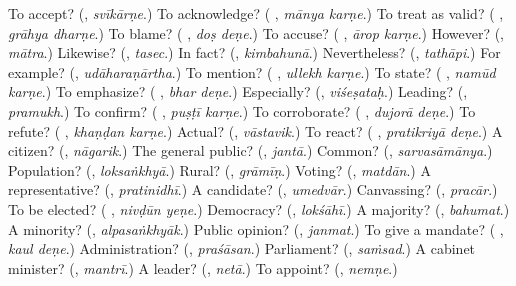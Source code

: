 \begin{tcolorbox}[breakable,colback=teal!4,colframe=teal!35!black,title={Before you move on}]
To accept? (\textbf{}, \emph{svīkārṇe}.) To acknowledge? (\textbf{ }, \emph{mānya karṇe}.) To treat as valid? (\textbf{ }, \emph{grāhya dharṇe}.) To blame? (\textbf{ }, \emph{doṣ deṇe}.) To accuse? (\textbf{ }, \emph{ārop karṇe}.) However? (\textbf{}, \emph{mātra}.) Likewise? (\textbf{}, \emph{tasec}.) In fact? (\textbf{}, \emph{kimbahunā}.) Nevertheless? (\textbf{}, \emph{tathāpi}.) For example? (\textbf{}, \emph{udāharaṇārtha}.) To mention? (\textbf{ }, \emph{ullekh karṇe}.) To state? (\textbf{ }, \emph{namūd karṇe}.) To emphasize? (\textbf{ }, \emph{bhar deṇe}.) Especially? (\textbf{}, \emph{viśeṣataḥ}.) Leading? (\textbf{}, \emph{pramukh}.) To confirm? (\textbf{ }, \emph{puṣṭī karṇe}.) To corroborate? (\textbf{ }, \emph{dujorā deṇe}.) To refute? (\textbf{ }, \emph{khaṇḍan karṇe}.) Actual? (\textbf{}, \emph{vāstavik}.) To react? (\textbf{ }, \emph{pratikriyā deṇe}.) A citizen? (\textbf{}, \emph{nāgarik}.) The general public? (\textbf{}, \emph{jantā}.) Common? (\textbf{}, \emph{sarvasāmānya}.) Population? (\textbf{}, \emph{loksaṅkhyā}.) Rural? (\textbf{}, \emph{grāmīṇ}.) Voting? (\textbf{}, \emph{matdān}.) A representative? (\textbf{}, \emph{pratinidhī}.) A candidate? (\textbf{}, \emph{umedvār}.) Canvassing? (\textbf{}, \emph{pracār}.) To be elected? (\textbf{ }, \emph{nivḍūn yeṇe}.) Democracy? (\textbf{}, \emph{lokśāhī}.) A majority? (\textbf{}, \emph{bahumat}.) A minority? (\textbf{}, \emph{alpasaṅkhyāk}.) Public opinion? (\textbf{}, \emph{janmat}.) To give a mandate? (\textbf{ }, \emph{kaul deṇe}.) Administration? (\textbf{}, \emph{praśāsan}.) Parliament? (\textbf{}, \emph{saṁsad}.) A cabinet minister? (\textbf{}, \emph{mantrī}.) A leader? (\textbf{}, \emph{netā}.) To appoint? (\textbf{}, \emph{nemṇe}.)
\end{tcolorbox}
